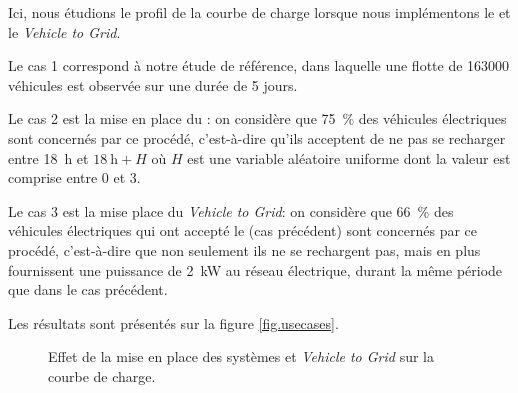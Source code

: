 				Ici, nous étudions le profil de la courbe de charge lorsque nous implémentons le \smartgrid{} et le \emph{Vehicle to Grid}.
				
				Le cas 1 correspond à notre étude de référence, dans laquelle une flotte de 163000 véhicules est observée sur une durée de 5 jours.
				
				Le cas 2 est la mise en place du \smartgrid{}: on considère que \SI{75}{\percent} des véhicules électriques sont concernés par ce procédé, c'est-à-dire qu'ils acceptent de ne pas se recharger entre \SI{18}{\hour} et $\SI{18}{\hour}+H$ où $H$ est une variable aléatoire uniforme dont la valeur est comprise entre 0 et 3.
				
				Le cas 3 est la mise place du \emph{Vehicle to Grid}: on considère que \SI{66}{\percent} des véhicules électriques qui ont accepté le \smartgrid{} (cas précédent) sont concernés par ce procédé, c'est-à-dire que non seulement ils ne se rechargent pas, mais en plus fournissent une puissance de \SI{2}{\kilo\watt} au réseau électrique, durant la même période que dans le cas précédent.
				
				Les résultats sont présentés sur la figure \vref{fig.usecases}.
				
				\begin{figure}[!h]
					\centering
					\caption{Effet de la mise en place des systèmes \smartgrid{} et \emph{Vehicle to Grid} sur la courbe de charge. \label{fig.usecases}}
				\end{figure}
				

